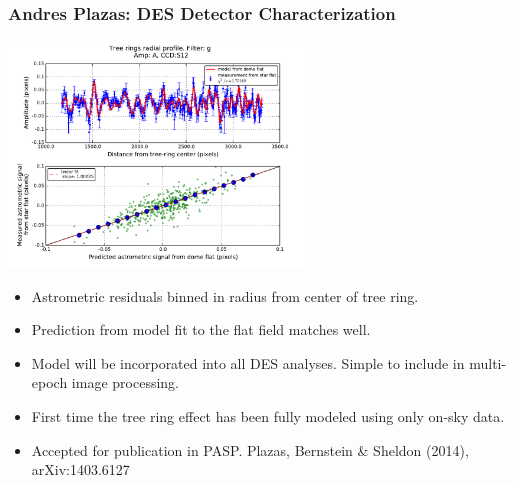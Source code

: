 \documentclass{beamer}
\begin{document}
\frame
{
    \frametitle{Andres Plazas: DES Detector Characterization}

    \begin{center}
    \includegraphics[width=0.6\textwidth]{astrometric_residuals_vs_model_S12.pdf}
\end{center}

    \fontsize{8}{0.8\baselineskip}
        \begin{itemize}
            \item Astrometric residuals binned in radius from center of tree ring.
            \item Prediction from model fit to the flat field matches well.
            \item Model will be incorporated into all DES analyses.  Simple
                to include in multi-epoch image processing.

            \item First time the tree ring effect has been fully modeled using
                only on-sky data.

            \item Accepted for publication in PASP.  Plazas, Bernstein \&
                Sheldon (2014), arXiv:1403.6127

        \end{itemize}
}
\end{document}

